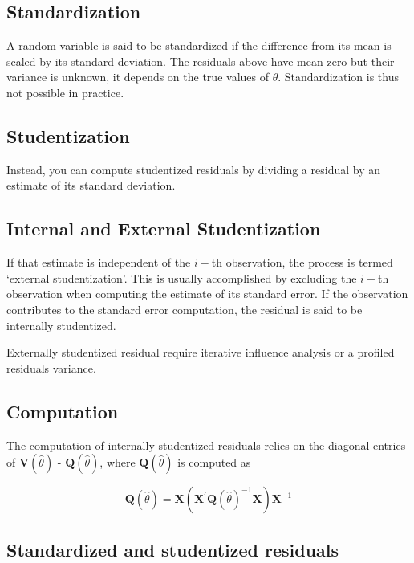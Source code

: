 \documentclass[Main.tex]{subfiles}
\begin{document}
	\subsection{Standardization} %
	
	A random variable is said to be standardized if the difference from its mean is scaled by its standard deviation. The residuals above have mean zero but their variance is unknown, it depends on the true values of $\theta$. Standardization is thus not possible in practice.
	
	\subsection{Studentization} %
	Instead, you can compute studentized residuals by dividing a residual by an estimate of its standard deviation. 
	
	\subsection{Internal and External Studentization} %
	If that estimate is independent of the $i-$th observation, the process is termed `external studentization'. This is usually accomplished by excluding the $i-$th observation when computing the estimate of its standard error. If the observation contributes to the
	standard error computation, the residual is said to be internally studentized.
	
	Externally  studentized residual require iterative influence analysis or a profiled residuals variance.
	
	
	\subsection{Computation}%
	
	The computation of internally studentized residuals relies on the diagonal entries of $\boldsymbol{V} (\hat{\theta})$ - $\boldsymbol{Q} (\hat{\theta})$, where $\boldsymbol{Q} (\hat{\theta})$ is computed as
	
	\[ \boldsymbol{Q} (\hat{\theta}) = \boldsymbol{X} ( \boldsymbol{X}^{\prime}\boldsymbol{Q} (\hat{\theta})^{-1}\boldsymbol{X})\boldsymbol{X}^{-1} \]
	
	\newpage
	\subsection{Standardized and studentized residuals} %
	
\end{document}
